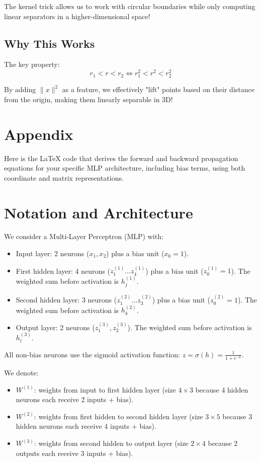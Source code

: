 \documentclass{tufte-handout}
\begin{document}
The kernel trick allows us to work with circular boundaries while only 
computing linear separators in a higher-dimensional space!

\subsection{Why This Works}
The key property:
\[
r_1 < r < r_2 \iff r_1^2 < r^2 < r_2^2
\]

By adding $\|x\|^2$ as a feature, we effectively "lift" points based on 
their distance from the origin, making them linearly separable in 3D!



\section{Appendix}

Here is the LaTeX code that derives the forward and backward propagation equations for your specific MLP architecture, including bias terms, using both coordinate and matrix representations.


\section{Notation and Architecture}
We consider a Multi-Layer Perceptron (MLP) with:
\begin{itemize}
    \item Input layer: 2 neurons ($x_1, x_2$) plus a bias unit ($x_0 = 1$).
    \item First hidden layer: 4 neurons ($z^{(1)}_1 \dots z^{(1)}_4$) plus a bias unit ($z^{(1)}_0 = 1$). The weighted sum before activation is $h^{(1)}_j$.
    \item Second hidden layer: 3 neurons ($z^{(2)}_1 \dots z^{(2)}_3$) plus a bias unit ($z^{(2)}_0 = 1$). The weighted sum before activation is $h^{(2)}_k$.
    \item Output layer: 2 neurons ($z^{(3)}_1, z^{(3)}_2$). The weighted sum before activation is $h^{(3)}_l$.
\end{itemize}
All non-bias neurons use the sigmoid activation function: $z = \sigma(h) = \frac{1}{1+e^{-h}}$.

We denote:
\begin{itemize}
    \item $W^{(1)}$: weights from input to first hidden layer (size $4 \times 3$ because 4 hidden neurons each receive 2 inputs + bias).
    \item $W^{(2)}$: weights from first hidden to second hidden layer (size $3 \times 5$ because 3 hidden neurons each receive 4 inputs + bias).
    \item $W^{(3)}$: weights from second hidden to output layer (size $2 \times 4$ because 2 outputs each receive 3 inputs + bias).
\end{itemize}
\end{document}
